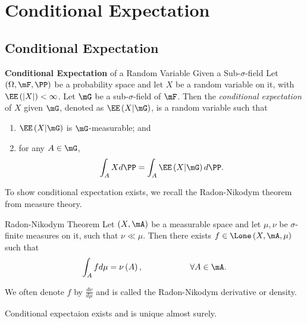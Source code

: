 \documentclass[stat901]{subfiles}
\begin{document}
    \section{Conditional Expectation}
    
    \subsection{Conditional Expectation}
    
    \begin{definition}{\textbf{Conditional Expectation} of a Random Variable Given a Sub-$\sigma$-field}
        Let $\left( \Omega,\mF,\PP \right)$ be a probability space and let $X$ be a random variable on it, with $\EE\left( \left| X \right| \right)<\infty$. Let $\mG$ be a sub-$\sigma$-field of $\mF$. Then the \emph{conditional expectation} of $X$ given $\mG$, denoted as $\EE\left( X|\mG \right)$, is a random variable such that
        \begin{enumerate}
            \item $\EE\left( X|\mG \right)$ is $\mG$-measurable; and
            \item for any $A\in\mG$,
                \begin{equation*}
                    \int_AXd\PP = \int_A\EE\left( X|\mG \right)d\PP.
                \end{equation*}
        \end{enumerate}
    \end{definition}

    \np To show conditional expectation exists, we recall the Radon-Nikodym theorem from measure theory.

    \begin{theorem}{Radon-Nikodym Theorem}
        Let $\left( X,\mA \right)$ be a measurable space and let $\mu,\nu$ be $\sigma$-finite measures on it, such that $\nu\ll\mu$. Then there exists $f\in\Lone\left( X,\mA,\mu \right)$ such that
        \begin{equation*}
            \int_Afd\mu = \nu\left( A \right),\hspace{2cm}\forall A\in\mA.
        \end{equation*}
    \end{theorem}

    \rruleline

    \np We often denote $f$ by $\frac{d\nu}{d\mu}$ and is called the Radon-Nikodym derivative or density.
    
    \begin{prop}{}
        Conditional expectaion exists and is unique almost surely.
    \end{prop}
\end{document}
